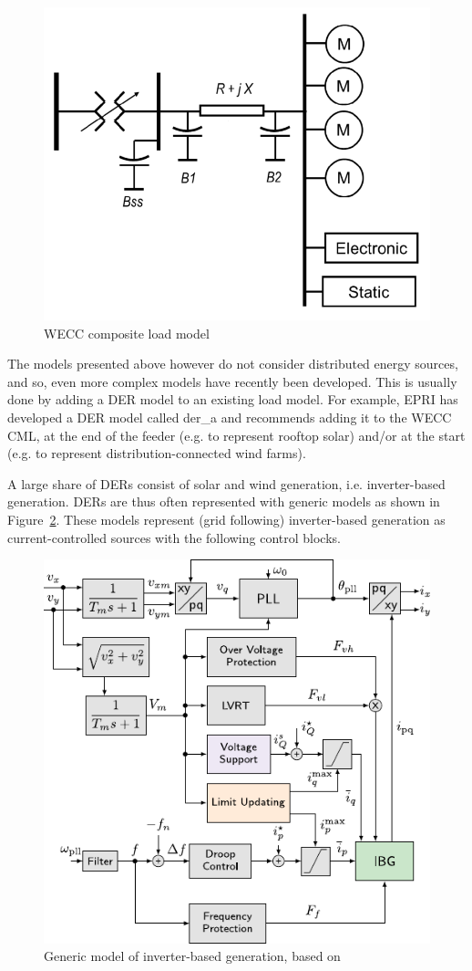 \begin{figure}
    \centering
    \includegraphics[width=0.5\linewidth]{Figs/WECC-composite-load-model.png}
    \caption{WECC composite load model~\cite{NERCloadModelTF}}
    \label{fig:WECC-CLM}
\end{figure}

The models presented above however do not consider distributed energy sources, and so, even more complex models have recently been developed. This is usually done by adding a DER model to an existing load model. For example, EPRI has developed a DER model called der\_a and recommends adding it to the WECC CML, at the end of the feeder (e.g. to represent rooftop solar) and/or at the start (e.g. to represent distribution-connected wind farms).

A large share of DERs consist of solar and wind generation, i.e. inverter-based generation. DERs are thus often represented with generic models as shown in Figure~\ref{fig:IBG}. These models represent (grid following) inverter-based generation as current-controlled sources with the following control blocks.

\begin{figure}
    \centering
    \includegraphics[width=0.6\linewidth]{Figs/IBG.pdf}
    \caption{Generic model of inverter-based generation, based on~\cite{Vorwerk}}
    \label{fig:IBG}
\end{figure}


